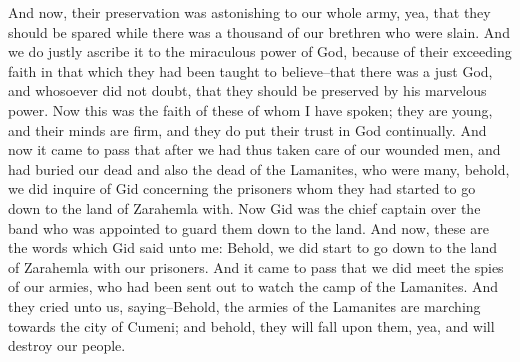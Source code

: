 And now, their preservation was astonishing to our whole army, yea, that they should be spared while there was a thousand of our brethren who were slain. And we do justly ascribe it to the miraculous power of God, because of their exceeding faith in that which they had been taught to believe--that there was a just God, and whosoever did not doubt, that they should be preserved by his marvelous power.
\bverse \iffalse Now this was the faith of these of whom I have spoken; they are young, and their minds are firm, and they do put their trust in God continually. \fi
Now this was the faith of these of whom I have spoken; they are young, and their minds are firm, and they do put their trust in God continually.
\bverse \iffalse And now it came to pass that after we had thus taken care of our wounded men, and had buried our dead and also the dead of the Lamanites, who were many, behold, we did inquire of Gid concerning the prisoners whom they had started to go down to the land of Zarahemla with. \fi
And now it came to pass that after we had thus taken care of our wounded men, and had buried our dead and also the dead of the Lamanites, who were many, behold, we did inquire of Gid concerning the prisoners whom they had started to go down to the land of Zarahemla with.
\bverse \iffalse Now Gid was the chief captain over the band who was appointed to guard them down to the land. \fi
Now Gid was the chief captain over the band who was appointed to guard them down to the land.
\bverse \iffalse And now, these are the words which Gid said unto me: Behold, we did start to go down to the land of Zarahemla with our prisoners. And it came to pass that we did meet the spies of our armies, who had been sent out to watch the camp of the Lamanites. \fi
And now, these are the words which Gid said unto me: Behold, we did start to go down to the land of Zarahemla with our prisoners. And it came to pass that we did meet the spies of our armies, who had been sent out to watch the camp of the Lamanites.
\bverse \iffalse And they cried unto us, saying--Behold, the armies of the Lamanites are marching towards the city of Cumeni; and behold, they will fall upon them, yea, and will destroy our people. \fi
And they cried unto us, saying--Behold, the armies of the Lamanites are marching towards the city of Cumeni; and behold, they will fall upon them, yea, and will destroy our people.
\bverse \iffalse And it came to pass that our prisoners did hear their cries, which caused them to take courage; and they did rise up in rebellion against us. \fi
